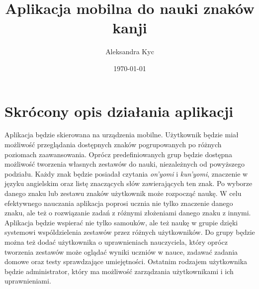 \documentclass[11pt]{article}
\title{ Aplikacja mobilna do nauki znaków kanji }
\author{ Aleksandra Kyc }
\date{\today}
\begin{document}
\maketitle	



\section*{Skrócony opis działania aplikacji}

Aplikacja b\k{e}dzie skierowana na urządzenia mobilne. Użytkownik b\k{e}dzie miał możliwość przeglądania dost\k{e}pnych znaków pogrupowanych po różnych poziomach zaawansowania. Oprócz predefiniowanych grup b\k{e}dzie dost\k{e}pna możliwość tworzenia własnych zestawów do nauki, niezależnych od powyższego podziału. Każdy znak b\k{e}dzie posiadał czytania \textit{on'yomi} i \textit{kun'yomi}, znaczenie w j\k{e}zyku angielskim oraz list\k{e} znaczących słów zawierających ten znak. Po wyborze danego znaku lub zestawu znaków użytkownik może rozpocz\k{a}ć nauk\k{e}. W celu efektywnego nauczania aplikacja poprosi ucznia nie tylko znaczenie danego znaku, ale też o rozwi\k{a}zanie zadań z różnymi złożeniami danego znaku z innymi. Aplikacja b\k{e}dzie wspierać nie tylko samouków, ale też nauk\k{e} w grupie dzi\k{e}ki systemowi wspóldzielenia zestawów przez różnych użytkowników. Do grupy b\k{e}dzie można też dodać użytkownika o uprawnieniach nauczyciela, który oprócz tworzenia zestawów może ogl\k{a}dać wyniki uczniów w nauce, zadawać zadania domowe oraz testy sprawdzaj\k{a}ce umiej\k{e}tności. Ostatnim rodzajem użytkownika b\k{e}dzie administrator, który ma możliwość zarz\k{a}dzania użytkownikami i ich uprawnieniami.

\end{document}
